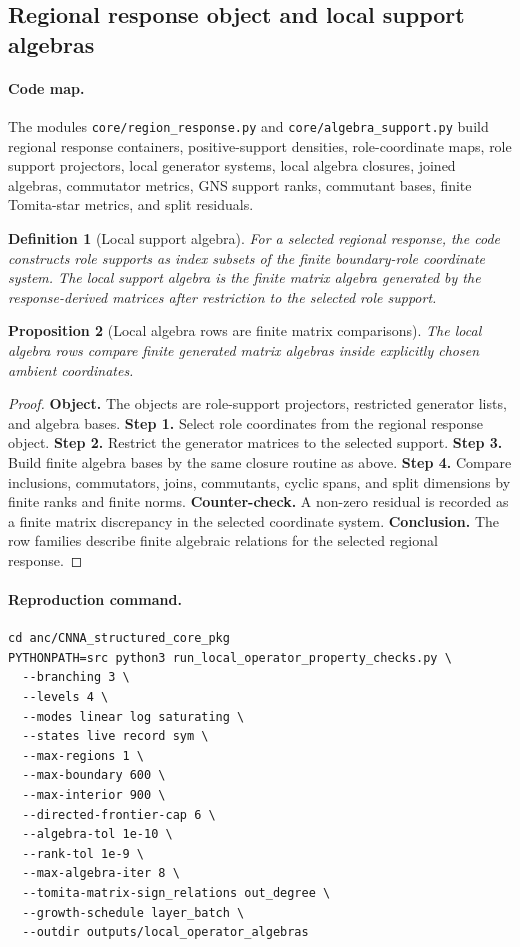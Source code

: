 \documentclass[11pt]{article}
\newtheorem{definition}{Definition}[section]
\newtheorem{proposition}[definition]{Proposition}
\theoremstyle{remark}
\newcommand{\code}[1]{\texttt{#1}}
\numberwithin{equation}{section}
\begin{document}
\subsection{Regional response object and local support algebras}
\paragraph{Code map.} The modules \code{core/region\_\allowbreak{}response.py} and \code{core/algebra\_\allowbreak{}support.py} build regional response containers, positive-support densities, role-coordinate maps, role support projectors, local generator systems, local algebra closures, joined algebras, commutator metrics, GNS support ranks, commutant bases, finite Tomita-star metrics, and split residuals.

\begin{definition}[Local support algebra]
For a selected regional response, the code constructs role supports as index subsets of the finite boundary-role coordinate system. The local support algebra is the finite matrix algebra generated by the response-derived matrices after restriction to the selected role support.
\end{definition}

\begin{proposition}[Local algebra rows are finite matrix comparisons]
The local algebra rows compare finite generated matrix algebras inside explicitly chosen ambient coordinates.
\end{proposition}
\begin{proof}
\textbf{Object.} The objects are role-support projectors, restricted generator lists, and algebra bases. \textbf{Step 1.} Select role coordinates from the regional response object. \textbf{Step 2.} Restrict the generator matrices to the selected support. \textbf{Step 3.} Build finite algebra bases by the same closure routine as above. \textbf{Step 4.} Compare inclusions, commutators, joins, commutants, cyclic spans, and split dimensions by finite ranks and finite norms. \textbf{Counter-check.} A non-zero residual is recorded as a finite matrix discrepancy in the selected coordinate system. \textbf{Conclusion.} The row families describe finite algebraic relations for the selected regional response.
\end{proof}

\paragraph{Reproduction command.}
\begin{verbatim}
cd anc/CNNA_structured_core_pkg
PYTHONPATH=src python3 run_local_operator_property_checks.py \
  --branching 3 \
  --levels 4 \
  --modes linear log saturating \
  --states live record sym \
  --max-regions 1 \
  --max-boundary 600 \
  --max-interior 900 \
  --directed-frontier-cap 6 \
  --algebra-tol 1e-10 \
  --rank-tol 1e-9 \
  --max-algebra-iter 8 \
  --tomita-matrix-sign_relations out_degree \
  --growth-schedule layer_batch \
  --outdir outputs/local_operator_algebras
\end{verbatim}
\end{document}
